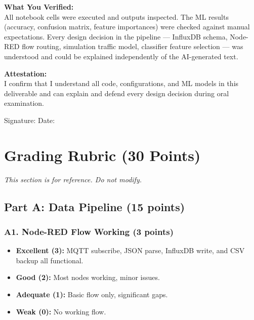 \documentclass[11pt]{article}
\begin{document}
\noindent\textbf{What You Verified:}\\{}
All notebook cells were executed and outputs inspected. The ML results (accuracy, confusion matrix, feature importances) were checked against manual expectations. Every design decision in the pipeline --- InfluxDB schema, Node-RED flow routing, simulation traffic model, classifier feature selection --- was understood and could be explained independently of the AI-generated text.

\vspace{0.5em}

\noindent\textbf{Attestation:}\\{}
I confirm that I understand all code, configurations, and ML models in this deliverable and can explain and defend every design decision during oral examination.

\vspace{1em}
\noindent Signature: \underline{\hspace{5cm}} \hfill Date: \underline{\hspace{3cm}}

\newpage
\section{Grading Rubric (30 Points)}
\label{sec:rubric}

\textit{This section is for reference. Do not modify.}

\vspace{1em}

\subsection*{Part A: Data Pipeline (15 points)}

\subsubsection*{A1. Node-RED Flow Working (3 points)}
\begin{itemize}[noitemsep]
    \item \textbf{Excellent (3):} MQTT subscribe, JSON parse, InfluxDB write, and CSV backup all functional.
    \item \textbf{Good (2):} Most nodes working, minor issues.
    \item \textbf{Adequate (1):} Basic flow only, significant gaps.
    \item \textbf{Weak (0):} No working flow.
\end{itemize}
\end{document}
